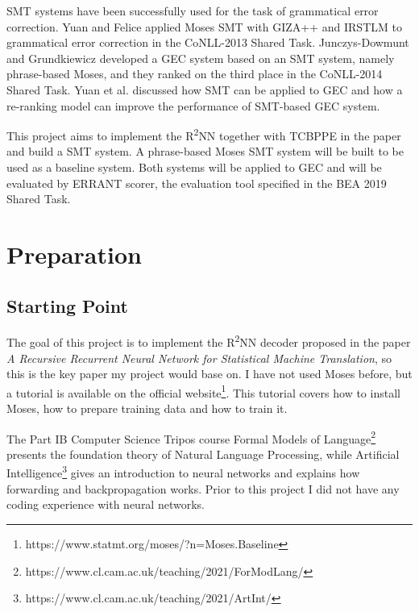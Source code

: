 \documentclass[12pt,a4paper,twoside,openright]{report}
\begin{document}
SMT systems have been successfully used for the task of grammatical error correction. Yuan and Felice\cite{yuan-felice-2013-constrained} applied Moses SMT with GIZA++ and IRSTLM to grammatical error correction in the CoNLL-2013 Shared Task\cite{ng-etal-2013-conll}. Junczys-Dowmunt and Grundkiewicz\cite{junczys-dowmunt-grundkiewicz-2014-amu} developed a GEC system based on an SMT system, namely phrase-based Moses\cite{moses}, and they ranked on the third place in the CoNLL-2014 Shared Task\cite{ng-etal-2014-conll}. Yuan et al.\cite{yuan-etal-2016-candidate} discussed how SMT can be applied to GEC and how a re-ranking model can improve the performance of SMT-based GEC system.

This project aims to implement the R\textsuperscript{2}NN together with TCBPPE in the paper\cite{r2nn} and build a SMT system. A phrase-based Moses SMT system\cite{moses} will be built to be used as a baseline system. Both systems will be applied to GEC and will be evaluated by ERRANT scorer\cite{bryant-etal-2017-automatic}\cite{felice-etal-2016-automatic}, the evaluation tool specified in the BEA 2019 Shared Task\cite{bryant-etal-2019-bea}.


\chapter{Preparation}

\section{Starting Point}

The goal of this project is to implement the R\textsuperscript{2}NN decoder proposed in the paper \textit{A Recursive Recurrent Neural Network for Statistical Machine Translation}\cite{r2nn}, so this is the key paper my project would base on. I have not used Moses\cite{moses} before, but a tutorial is available on the official website\footnote{https://www.statmt.org/moses/?n=Moses.Baseline}. This tutorial covers how to install Moses, how to prepare training data and how to train it.

The Part IB Computer Science Tripos course Formal Models of Language\footnote{https://www.cl.cam.ac.uk/teaching/2021/ForModLang/} presents the foundation theory of Natural Language Processing, while Artificial Intelligence\footnote{https://www.cl.cam.ac.uk/teaching/2021/ArtInt/} gives an introduction to neural networks and explains how forwarding and backpropagation works. Prior to this project I did not have any coding experience with neural networks.
\end{document}
